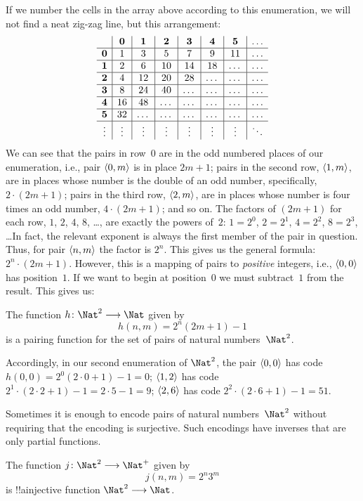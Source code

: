 \documentclass[../../../include/open-logic-section]{subfiles}
\begin{document}
\begin{explain}
\[\]
If we number the cells in the array above according to this
enumeration, we will not find a neat zig-zag line, but this
arrangement:
\[
\begin{array}{ c | c | c | c | c | c | c | c }
& \textbf 0 & \textbf 1 & \textbf 2 & \textbf 3 & \textbf 4 & \textbf 5 & \dots \\
\hline
\textbf 0 & 1 & 3 & 5 & 7 & 9 & 11 & \dots \\
\hline
\textbf 1 & 2 & 6 & 10 & 14 & 18 & \dots & \dots \\
\hline
\textbf 2 & 4 & 12 & 20 & 28 & \dots & \dots & \dots \\
\hline
\textbf 3 & 8 & 24 & 40 & \dots & \dots & \dots & \dots \\
\hline
\textbf 4 & 16 & 48 & \dots & \dots & \dots & \dots & \dots \\
\hline
\textbf 5 & 32 & \dots & \dots & \dots & \dots & \dots & \dots \\
\hline
\vdots & \vdots & \vdots & \vdots & \vdots & \vdots & \vdots & \ddots\\
\end{array}
\]
We can see that the pairs in row~$0$ are in the odd numbered places of
our enumeration, i.e., pair $\langle 0,m \rangle$ is in place $2m+1$; pairs in
the second row, $\langle 1,m \rangle$, are in places whose number is the
double of an odd number, specifically,  $2 \cdot (2m+1)$; pairs in the
third row, $\langle 2,m \rangle$, are in places whose number is four times an
odd number, $4 \cdot (2m+1)$; and so on. The factors of $(2m+1)$ for
each row, $1$, $2$, $4$, $8$, \dots, are exactly the powers of~$2$:
$1= 2^0$, $2 = 2^1$, $4 = 2^2$, $8 = 2^3$, \dots\@ In fact, the
relevant exponent is always the first member of the pair in
question. Thus, for pair $\langle n,m \rangle$ the factor is $2^n$.  This
gives us the general formula: $2^n \cdot (2m+1)$. However, this is a
mapping of pairs to \emph{positive} integers, i.e., $\langle 0,0 \rangle$ has
position~$1$. If we want to begin at position~$0$ we must subtract~$1$
from the result. This gives us:
\end{explain}

\begin{ex}
The function $h\colon \Nat^2 \to \Nat$ given by
\[
h(n,m) = 2^n (2m+1) - 1
\]
is a pairing function for the set of pairs of natural numbers~$\Nat^2$.
\end{ex}

\begin{explain}
Accordingly, in our second enumeration of $\Nat^2$, the pair
$\langle 0,0 \rangle$ has code $h(0,0) = 2^0(2\cdot 0+1) - 1 = 0$;
$\langle 1,2 \rangle$ has code $2^{1} \cdot (2 \cdot 2 + 1) - 1 = 2
\cdot 5 - 1 = 9$; $\langle 2,6 \rangle$ has code $2^{2} \cdot (2
\cdot 6 + 1) - 1 = 51$.
\end{explain}

Sometimes it is enough to encode pairs of natural numbers~$\Nat^2$
without requiring that the encoding is surjective. Such encodings have
inverses that are only partial functions. 

\begin{ex}
The function $j\colon \Nat^2 \to \Nat^+$ given by
\[
j(n,m) = 2^n3^m
\]
is !!a{injective} function $\Nat^2 \to \Nat$.
\end{ex}
\end{document}
